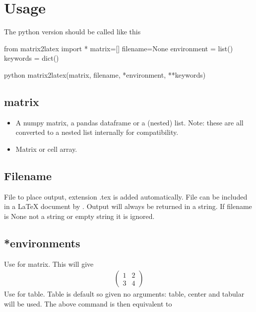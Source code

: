\section{Usage}
The python version should be called like this
\begin{pycode}
from matrix2latex import *
matrix=[]
filename=None
environment = list()
keywords = dict()
\end{pycode}
\begin{pygments}{python}
matrix2latex(matrix, filename, *environment, **keywords)
\end{pygments}

  
\subsection{matrix}
\begin{itemize}
\item[Python:] A numpy matrix, a pandas dataframe or a (nested) list. 
  Note: these are all converted to a nested list internally for compatibility.
\item[Matlab:] Matrix or cell array.
\end{itemize}
\subsection{Filename}
  File to place output, extension .tex is added automatically. File can be included in a LaTeX
  document by \verb!!. Output will always be returned in a string. If filename is None
  not a string or empty string it is ignored.
  
\subsection{*environments}
  Use 
 for matrix.
  This will give
  \begin{align*}
    \begin{pmatrix}
      1 & 2 \\
      3 & 4
    \end{pmatrix}
  \end{align*}
  Use 
 for table.
  Table is default so given no arguments: table, center and tabular will be used.
  The above command is then equivalent to \\

